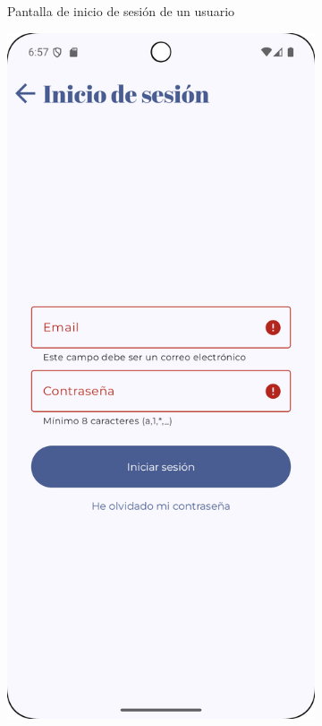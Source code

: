 \begin{figure}[H]
\begin{subfigure}[b]{0.3\textwidth}
      \caption{Pantalla de inicio de sesión de un usuario}
      \label{fig:login-main}
    \end{subfigure}
    \hfill
    \begin{subfigure}[b]{0.3\textwidth}
      \includegraphics[width=\textwidth]{./img/manual/login_empty_fields.png}

\end{subfigure}
\end{figure}
